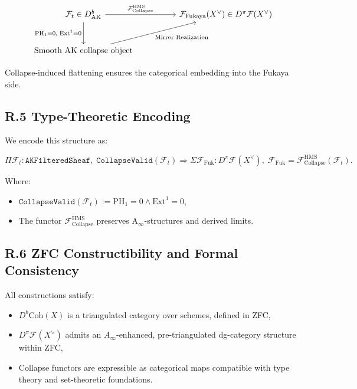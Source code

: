 \documentclass[11pt]{article}
\begin{document}
\[
\begin{tikzcd}[column sep=huge, row sep=large]
\mathcal{F}_t \in D^b_{\mathrm{AK}} \arrow[r, "{\mathcal{F}_{\mathrm{Collapse}}^{\mathrm{HMS}}}"] \arrow[d, swap, "{\mathrm{PH}_1 = 0,\; \mathrm{Ext}^1 = 0}"]
& \mathcal{F}_{\mathrm{Fukaya}}(X^\vee) \in D^\pi\mathcal{F}(X^\vee) \\
\text{Smooth AK collapse object} \arrow[ru, swap, "{\text{Mirror Realization}}"] &
\end{tikzcd}
\]

Collapse-induced flattening ensures the categorical embedding into the Fukaya side.

\subsection*{R.5 Type-Theoretic Encoding}

We encode this structure as:

\[
\Pi \mathcal{F}_t : \texttt{AKFilteredSheaf},\;
\texttt{CollapseValid}(\mathcal{F}_t)
\Rightarrow
\Sigma \mathcal{F}_{\mathrm{Fuk}} : D^\pi\mathcal{F}(X^\vee),\;
\mathcal{F}_{\mathrm{Fuk}} = \mathcal{F}_{\mathrm{Collapse}}^{\mathrm{HMS}}(\mathcal{F}_t).
\]

Where:
\begin{itemize}
  \item $\texttt{CollapseValid}(\mathcal{F}_t) := \mathrm{PH}_1 = 0 \wedge \mathrm{Ext}^1 = 0$,
  \item The functor $\mathcal{F}_{\mathrm{Collapse}}^{\mathrm{HMS}}$ preserves A$_\infty$-structures and derived limits.
\end{itemize}

\subsection*{R.6 ZFC Constructibility and Formal Consistency}

All constructions satisfy:

\begin{itemize}
  \item $D^b\mathrm{Coh}(X)$ is a triangulated category over schemes, defined in ZFC,
  \item $D^\pi\mathcal{F}(X^\vee)$ admits an $A_\infty$-enhanced, pre-triangulated dg-category structure within ZFC,
  \item Collapse functors are expressible as categorical maps compatible with type theory and set-theoretic foundations.
\end{itemize}
\end{document}
